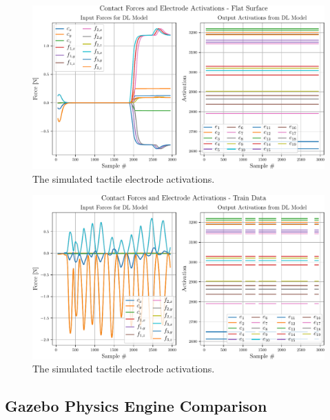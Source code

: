 \begin{figure}[!h]
	\begin{center}
		\includegraphics[width=\textwidth]{chapters/1-tactile-perception/fig/matplotlib/flat-contact-graph.pdf}
	\end{center}
	\caption{The simulated tactile electrode activations.}
	\label{fig:flat-contact-graph}
\end{figure}
\begin{figure}[!h]
	\begin{center}
		\includegraphics[width=\textwidth]{chapters/1-tactile-perception/fig/matplotlib/train-contact-graph.pdf}
	\end{center}
	\caption{The simulated tactile electrode activations.}
	\label{fig:train-contact-graph}
\end{figure}

\subsection{Gazebo Physics Engine Comparison}\label{sec:1-tactile-perception-results-gazebo-comparison}




